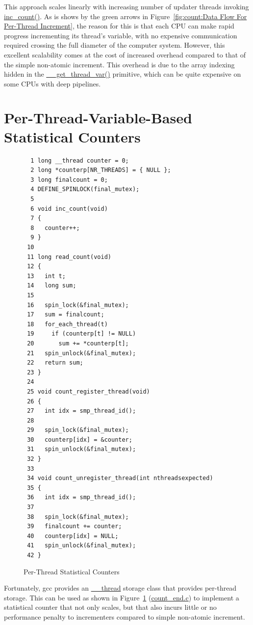 This approach scales linearly with increasing number of updater threads
invoking \url{inc_count()}.
As is shows by the green arrows in
Figure~\ref{fig:count:Data Flow For Per-Thread Increment},
the reason for this is that each CPU can make rapid progress incrementing
its thread's variable, with no expensive communication required crossing
the full diameter of the computer system.
However, this excellent scalability comes at the cost of increased
overhead compared to that of the simple non-atomic increment.
This overhead is due to the array indexing hidden in the
\url{__get_thread_var()} primitive, which can be quite expensive
on some CPUs with deep pipelines.

\section{Per-Thread-Variable-Based Statistical Counters}
\label{sec:count:Per-Thread-Variable-Based Statistical Counters}

\begin{figure}[bp]
{ \scriptsize
\begin{verbatim}
  1 long __thread counter = 0;
  2 long *counterp[NR_THREADS] = { NULL };
  3 long finalcount = 0;
  4 DEFINE_SPINLOCK(final_mutex);
  5 
  6 void inc_count(void)
  7 {
  8   counter++;
  9 }
 10 
 11 long read_count(void)
 12 {
 13   int t;
 14   long sum;
 15 
 16   spin_lock(&final_mutex);
 17   sum = finalcount;
 18   for_each_thread(t)
 19     if (counterp[t] != NULL)
 20       sum += *counterp[t];
 21   spin_unlock(&final_mutex);
 22   return sum;
 23 }
 24 
 25 void count_register_thread(void)
 26 {
 27   int idx = smp_thread_id();
 28 
 29   spin_lock(&final_mutex);
 30   counterp[idx] = &counter;
 31   spin_unlock(&final_mutex);
 32 }
 33 
 34 void count_unregister_thread(int nthreadsexpected)
 35 {
 36   int idx = smp_thread_id();
 37 
 38   spin_lock(&final_mutex);
 39   finalcount += counter;
 40   counterp[idx] = NULL;
 41   spin_unlock(&final_mutex);
 42 }
\end{verbatim}
}
\caption{Per-Thread Statistical Counters}
\label{fig:count:Per-Thread Statistical Counters}
\end{figure}

Fortunately, gcc provides an \url{__thread} storage class that provides
per-thread storage.
This can be used as shown in
Figure~\ref{fig:count:Per-Thread Statistical Counters} (\url{count_end.c})
to implement
a statistical counter that not only scales, but that also incurs little
or no performance penalty to incrementers compared to simple non-atomic
increment.


